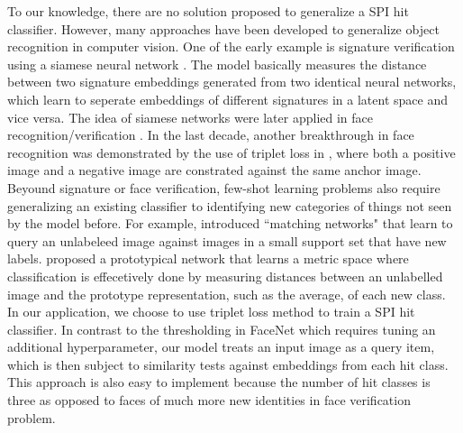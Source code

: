 To our knowledge, there are no solution proposed to generalize a SPI hit
classifier.  However, many approaches have been developed to generalize object
recognition in computer vision.  One of the early example is signature
verification using a siamese neural network
\cite{bromleySignatureVerificationUsing1994}.  The model basically measures the
distance between two signature embeddings generated from two identical neural
networks, which learn to seperate embeddings of different signatures in a latent
space and vice versa.  The idea of siamese networks were later applied in face
recognition/verification \cite{chopraLearningSimilarityMetric2005}.  In the last
decade, another breakthrough in face recognition was demonstrated by the use of
triplet loss in \cite{kochSiameseNeuralNetworks2015a}, where both a positive
image and a negative image are constrated against the same anchor image.
Beyound signature or face verification, few-shot learning problems also require
generalizing an existing classifier to identifying new categories of things not
seen by the model before.  For example, \cite{vinyalsMatchingNetworksOne2017}
introduced ``matching networks" that learn to query an unlabeleed image against
images in a small support set that have new labels.
\cite{snellPrototypicalNetworksFewshot2017} proposed a prototypical network that
learns a metric space where classification is effecetively done by measuring
distances between an unlabelled image and the prototype representation, such as
the average, of each new class.  In our application, we choose to use triplet
loss method to train a SPI hit classifier.  In contrast to the thresholding in
FaceNet which requires tuning an additional hyperparameter, our model treats an
input image as a query item, which is then subject to similarity tests against
embeddings from each hit class.  This approach is also easy to implement because
the number of hit classes is three as opposed to faces of much more new
identities in face verification problem.  
